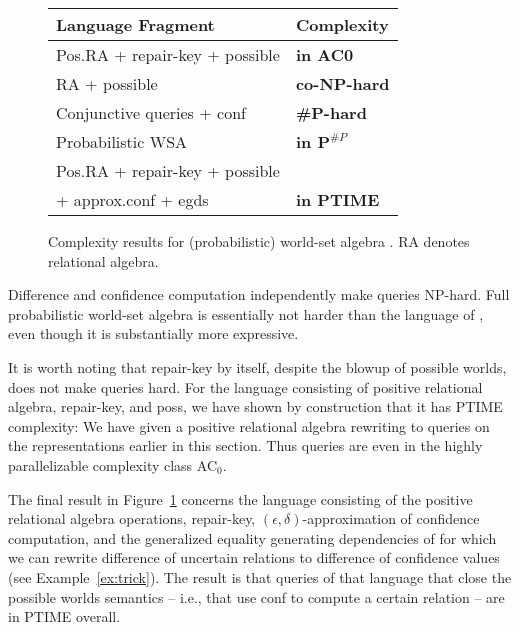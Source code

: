 \begin{figure}
\begin{center}
\begin{tabular}{|l|l|}
\hline
Language Fragment & Complexity \\
\hline
\hline
Pos.RA + repair-key + possible &
{\bf in AC0}
\\[.3ex]
RA + possible & {\bf co-NP-hard}
\\[.3ex]
Conjunctive queries + conf & {\bf \#P-hard}
\\[.3ex]
Probabilistic WSA & {\bf in ${\mathbf P^{\#P}}$}
\\[.5ex]
Pos.RA + repair-key + possible &
\\
+ approx.conf + egds &  {\bf in PTIME}
\\
\hline
\end{tabular}
\end{center}
%
\caption{Complexity results for (probabilistic) world-set algebra
\cite{KochBook2008}.
RA denotes relational algebra.}
\label{tab:complexity}
\end{figure}


Difference \cite{AKG1991} and confidence computation \cite{dalvi07efficient} independently make queries NP-hard.
Full probabilistic world-set algebra is essentially not harder than the language of \cite{dalvi07efficient}, even though it is substantially more expressive.

It is worth noting that repair-key by itself, despite the blowup of possible worlds, does not make queries hard. For the language consisting of positive relational algebra, repair-key, and poss, we have shown by construction that it has PTIME complexity: We have given a positive relational algebra rewriting to queries on the representations earlier in this section. Thus queries are even in the highly parallelizable complexity class AC$_0$.

The final result in Figure~\ref{tab:complexity} concerns the language consisting of the positive relational algebra operations, repair-key, $(\epsilon, \delta)$-approximation of confidence computation, and the generalized equality generating dependencies of \cite{Koch2008} for which we can rewrite difference of uncertain relations to difference of confidence values (see Example~\ref{ex:trick}). The result is that queries of that language that close the possible worlds semantics -- i.e., that use conf to compute a certain relation -- are in PTIME overall.








